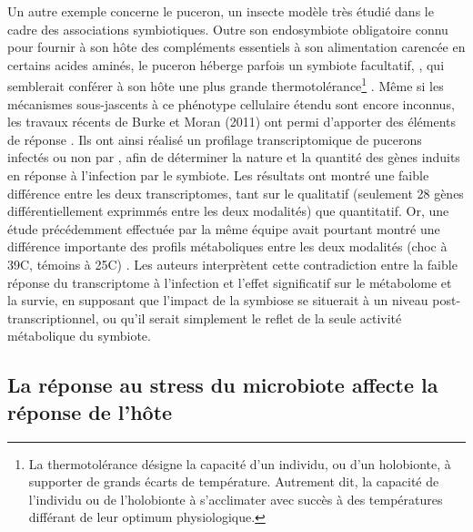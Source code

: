 Un autre exemple concerne le puceron, un insecte modèle très étudié dans le cadre des associations symbiotiques.
Outre son endosymbiote obligatoire  connu pour fournir à son hôte des compléments essentiels à son alimentation carencée en certains acides aminés, le puceron  héberge parfois un symbiote facultatif, , qui semblerait conférer à son hôte une plus grande thermotolérance\footnote{La thermotolérance désigne la capacité d'un individu, ou d'un holobionte, à supporter de grands écarts de température. Autrement dit, la capacité de l'individu ou de l'holobionte à s'acclimater avec succès à des températures différant de leur optimum physiologique.} \cite{montllor2002}.
Même si les mécanismes sous-jascents à ce phénotype cellulaire étendu sont encore inconnus, les travaux récents de Burke et Moran (2011) ont permi d'apporter des éléments de réponse \cite{burke2011}.
Ils ont ainsi réalisé un profilage transcriptomique de pucerons infectés ou non par , afin de déterminer la nature et la quantité des gènes induits en réponse à l’infection par le symbiote.
Les résultats ont montré une faible différence entre les deux transcriptomes, tant sur le qualitatif (seulement 28 gènes différentiellement exprimmés entre les deux modalités) que quantitatif.
Or, une étude précédemment effectuée par la même équipe avait pourtant montré une différence importante des profils métaboliques entre les deux modalités (choc à 39\textdegree{}C, témoins à 25\textdegree{}C) \cite{burke2009}.
Les auteurs interprètent cette contradiction entre la faible réponse du transcriptome à l'infection et l'effet significatif sur le métabolome et la survie, en supposant que l'impact de la symbiose se situerait à un niveau post-transcriptionnel, ou qu'il serait simplement le reflet de la seule activité métabolique du symbiote.


\subsection{La réponse au stress du microbiote affecte la réponse de l'hôte}

